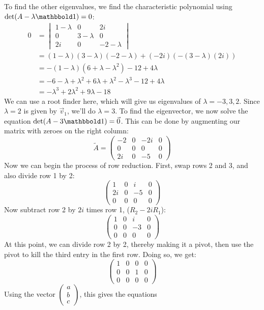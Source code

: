 \documentclass[10pt]{article}
\begin{document}
\begin{enumerate}[label=\alph*)]
\begin{solution}
				To find the other eigenvalues, we find the characteristic polynomial using $\det(A - \lambda 
				\mathbbold 1) = 0$:
				\begin{align*}
					0&=\begin{vmatrix} 1 - \lambda& 0 & 2i\\0 & 3-\lambda & 0\\2i & 0 & -2 - \lambda\end{vmatrix}
					\\
					 &= (1 - \lambda) (3 - \lambda)(-2 - \lambda) + (-2i)(-(3 - \lambda) (2i))\\
					 &= -(1 - \lambda)(6 + \lambda - \lambda^2) - 12 + 4\lambda\\
					 &= -6 - \lambda +  \lambda^2 + 6\lambda + \lambda^2 - \lambda^3 - 12 + 4\lambda \\
					 &= -\lambda^3 + 2\lambda^2 + 9\lambda - 18
				\end{align*} 
				We can use a root finder here, which will give us eigenvalues of $\lambda = -3, 3, 2$. Since
				$\lambda = 2$ is given by $\vec v_1$, we'll do $\lambda = 3$. To find the eigenvector, 
				we now solve the equation $\det(A - 3 \mathbbold 1) = \vec 0$. This can be done by 
				augmenting our matrix with zeroes on the right column: 
				\[
					\tilde A = \begin{pmatrix} -2 & 0 & -2i&0\\0&0&0&0\\2i&0&-5&0 \end{pmatrix} 
				\] 
				Now we can begin the process of row reduction. First, swap rows 2 and 3, and also divide 
				row 1 by 2:
				\[
					\begin{pmatrix} 1&0&i&0\\2i&0&-5&0\\0&0&0&0 \end{pmatrix} 
				\] 
				Now subtract row 2 by $2i$ times row 1, ($R_2 - 2iR_1$):
				\[
					\begin{pmatrix} 1&0&i&0\\0&0&-3&0\\0&0&0&0 \end{pmatrix} 
				\] 
				At this point, we can divide row 2 by 2, thereby making it a pivot, then use the pivot 
				to kill the third entry in the first row. Doing so, we get:
				\[
					\begin{pmatrix} 1&0&0&0\\0&0&1&0\\0&0&0&0 \end{pmatrix} 
				\] 
				Using the vector $\begin{pmatrix} a\\b\\c \end{pmatrix}$, this gives the equations

\end{solution}
\end{enumerate}
\end{document}
